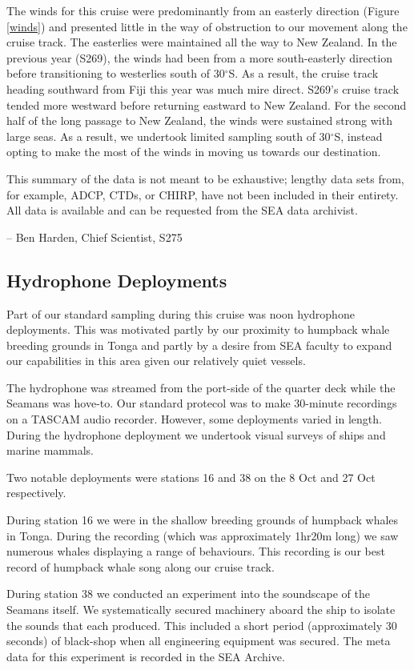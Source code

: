 \documentclass[letterpaper,11pt]{article}
\newcommand{\cruiseID}{S275}
\begin{document}
The winds for this cruise were predominantly from an easterly direction (Figure \ref{winds}) and presented little in the way of obstruction to our movement along the cruise track. The easterlies were maintained all the way to New Zealand. In the previous year (S269), the winds had been from a more south-easterly direction before transitioning to westerlies south of 30$^{\circ}$S. As a result, the cruise track heading southward from Fiji this year was much mire direct. S269's cruise track tended more westward before returning eastward to New Zealand. For the second half of the long passage to New Zealand, the winds were sustained strong with large seas. As a result, we undertook limited sampling south of 30$^{\circ}$S, instead opting to make the most of the winds in moving us towards our destination.

This summary of the data is not meant to be exhaustive; lengthy data sets from, for example, ADCP, CTDs, or CHIRP, have not been included in their entirety. All data is available and can be requested from the SEA data archivist.

-- Ben Harden, Chief Scientist, \cruiseID


\subsection*{Hydrophone Deployments}
Part of our standard sampling during this cruise was noon hydrophone deployments. This was motivated partly by our proximity to humpback whale breeding grounds in Tonga and partly by a desire from SEA faculty to expand our capabilities in this area given our relatively quiet vessels.

The hydrophone was streamed from the port-side of the quarter deck while the Seamans was hove-to. Our standard protecol was to make 30-minute recordings on a TASCAM audio recorder. However, some deployments varied in length. During the hydrophone deployment we undertook visual surveys of ships and marine mammals.

Two notable deployments were stations 16 and 38 on the 8 Oct and 27 Oct respectively.

During station 16 we were in the shallow breeding grounds of humpback whales in Tonga. During the recording (which was approximately 1hr20m long) we saw numerous whales displaying a range of behaviours. This recording is our best record of humpback whale song along our cruise track.

During station 38 we conducted an experiment into the soundscape of the Seamans itself. We systematically secured machinery aboard the ship to isolate the sounds that each produced. This included a short period (approximately 30 seconds) of black-shop when all engineering equipment was secured. The meta data for this experiment is recorded in the SEA Archive.
\end{document}
